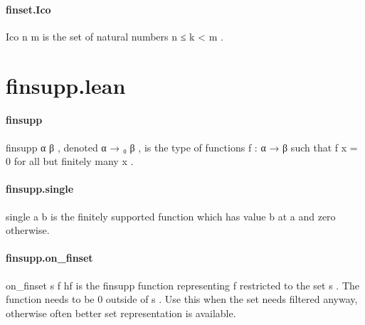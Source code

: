 \documentclass{article}
\begin{document}
\paragraph{finset.Ico}
\par
\colorbox[RGB]{253,246,227}{{{{\color[RGB]{101, 123, 131} Ico n m }}}} is the set of natural numbers 
\colorbox[RGB]{253,246,227}{{{{\color[RGB]{101, 123, 131} n  }}}{{{\color[RGB]{181, 137, 0} ≤ }}}{{{\color[RGB]{101, 123, 131}  k  }}}{{{\color[RGB]{181, 137, 0} < }}}{{{\color[RGB]{101, 123, 131}  m }}}}.
\section{finsupp.lean}\paragraph{finsupp}
\par
\colorbox[RGB]{253,246,227}{{{{\color[RGB]{101, 123, 131} finsupp α β }}}}, denoted 
\colorbox[RGB]{253,246,227}{{{{\color[RGB]{101, 123, 131} α  }}}{{{\color[RGB]{133, 153, 0} → }}}{{{\color[RGB]{101, 123, 131} ₀ β }}}}, is the type of functions 
\colorbox[RGB]{253,246,227}{{{{\color[RGB]{101, 123, 131} f : α  }}}{{{\color[RGB]{133, 153, 0} → }}}{{{\color[RGB]{101, 123, 131}  β }}}} such that
\colorbox[RGB]{253,246,227}{{{{\color[RGB]{101, 123, 131} f x  }}}{{{\color[RGB]{181, 137, 0} = }}}{{{\color[RGB]{101, 123, 131}   }}}{{{\color[RGB]{108, 113, 196} 0 }}}} for all but finitely many 
\colorbox[RGB]{253,246,227}{{{{\color[RGB]{101, 123, 131} x }}}}.
\paragraph{finsupp.single}
\par
\colorbox[RGB]{253,246,227}{{{{\color[RGB]{101, 123, 131} single a b }}}} is the finitely supported function which has
value 
\colorbox[RGB]{253,246,227}{{{{\color[RGB]{101, 123, 131} b }}}} at 
\colorbox[RGB]{253,246,227}{{{{\color[RGB]{101, 123, 131} a }}}} and zero otherwise.
\paragraph{finsupp.on\_finset}
\par
\colorbox[RGB]{253,246,227}{{{{\color[RGB]{101, 123, 131} on\_finset s f hf }}}} is the finsupp function representing 
\colorbox[RGB]{253,246,227}{{{{\color[RGB]{101, 123, 131} f }}}} restricted to the set 
\colorbox[RGB]{253,246,227}{{{{\color[RGB]{101, 123, 131} s }}}}.
The function needs to be 0 outside of 
\colorbox[RGB]{253,246,227}{{{{\color[RGB]{101, 123, 131} s }}}}. Use this when the set needs filtered anyway, otherwise
often better set representation is available.
\end{document}
